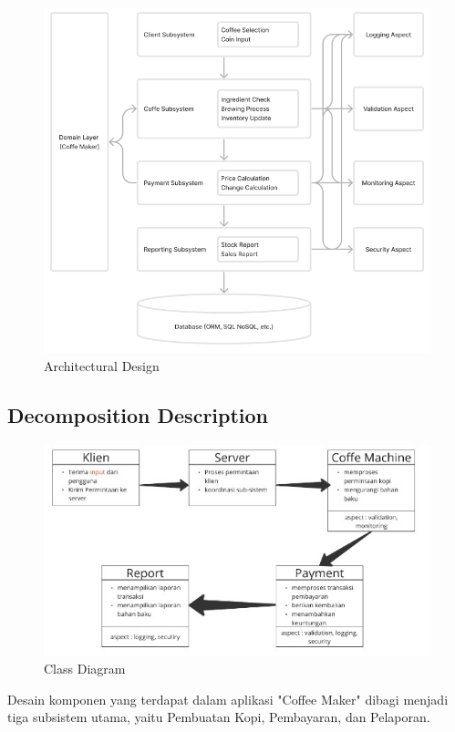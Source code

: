\documentclass[12pt]{article}
\begin{document}
\begin{figure}[tbh]
\centering
\includegraphics[width=0.7\linewidth]{./img/architecture_design.png}
\caption{Architectural Design}
\label{fig:image}
\end{figure}

\subsection{Decomposition Description}

\begin{figure}[tbh]
\centering
\includegraphics[width=0.7\linewidth]{./img/class_diagram.jpg}
\caption{Class Diagram}
\label{fig:image2}
\end{figure}

Desain komponen yang terdapat dalam aplikasi "Coffee Maker" dibagi menjadi tiga subsistem utama, yaitu Pembuatan Kopi, Pembayaran, dan Pelaporan.
\end{document}
